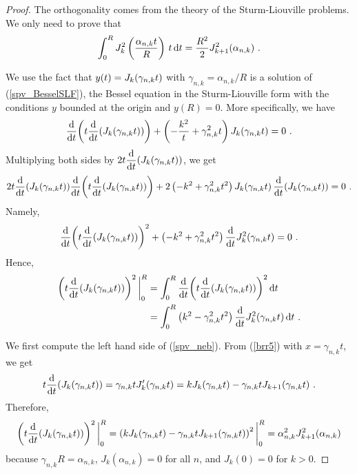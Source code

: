 \begin{proof}
The orthogonality comes from the theory of the Sturm-Liouville problems.
We only need to prove that
\begin{equation}\label{spv_nebi}
\int_0^R J_k^2\left(\frac{\alpha_{n,k} t}{R}\right)\, t \dx{t} =
\frac{R^2}{2} J_{k+1}^2(\alpha_{n,k}) \ .
\end{equation}

We use the fact that $\DS y(t) = J_k(\gamma_{n,k}t)$ with
$\gamma_{n,k} = \alpha_{n,k}/R$ is a solution of
(\ref{spv_BesselSLF}), the Bessel equation in the Sturm-Liouville
form with the conditions $y$ bounded at the origin and $y(R)=0$.
More specifically, we have
\[
\dfdx{\left( t \dfdx{\left(J_k(\gamma_{n,k}t)\right)}{t} \right)}{t}
+ \left( -\frac{k^2}{t} + \gamma_{n,k}^2 t\right) J_k(\gamma_{n,k}t) = 0 \ .
\]
Multiplying both sides by
$\DS 2 t \dfdx{\left( J_k(\gamma_{n,k}t)\right)}{t}$, we get
\[
2 t \dfdx{\left( J_k(\gamma_{n,k}t) \right)}{t}
\dfdx{\left( t \dfdx{\left(J_k(\gamma_{n,k}t)\right)}{t}\right)}{t}
+ 2\left( -k^2 + \gamma_{n,k}^2 t^2\right)
J_k(\gamma_{n,k}t)\, \dfdx{\left( J_k(\gamma_{n,k}t)\right)}{t} = 0 \ .
\]
Namely,
\[
\dfdx{\left( t \dfdx{\left(J_k(\gamma_{n,k}t)\right)}{t}\right)^2}{t} 
+ \left(- k^2 + \gamma_{n,k}^2 t^2\right)
\dfdx{ J_k^2(\gamma_{n,k}t)}{t} = 0 \ .
\]
Hence,
\begin{equation}\label{spv_neb}
\begin{split}
\left( t \dfdx{\left(J_k(\gamma_{n,k}t)\right)}{t}\right)^2\bigg|_0^R
& = \int_0^R
\dfdx{\left( t \dfdx{\left(J_k(\gamma_{n,k}t)\right)}{t}\right)^2}{t} \dx{t}\\
&= \int_0^R \left(k^2 - \gamma_{n,k}^2 t^2\right)
\dfdx{ J_k^2(\gamma_{n,k}t)}{t} \dx{t} \ .
\end{split}
\end{equation}

We first compute the left hand side of (\ref{spv_neb}).  From
(\ref{brr5}) with $x=\gamma_{n,k}t$, we get
\[
t \dfdx{\left( J_k(\gamma_{n,k}t) \right)}{t} 
= \gamma_{n,k}t J_k'(\gamma_{n,k}t)
= k J_k(\gamma_{n,k}t) - \gamma_{n,k}t J_{k+1}(\gamma_{n,k}t) \ .
\]
Therefore,
\[
\left( t \dfdx{\left(J_k(\gamma_{n,k}t)\right)}{t}\right)^2\bigg|_0^R
= \left( k J_k(\gamma_{n,k}t)
- \gamma_{n,k}t J_{k+1}(\gamma_{n,k}t) \right)^2\bigg|_0^R \\
= \alpha_{n,k}^2 J_{k+1}^2(\alpha_{n,k})
\]
because $\gamma_{n,k}R = \alpha_{n,k}$, $J_k(\alpha_{n,k})=0$ for
all $n$, and $J_k(0) = 0$ for $k>0$.


\end{proof}
